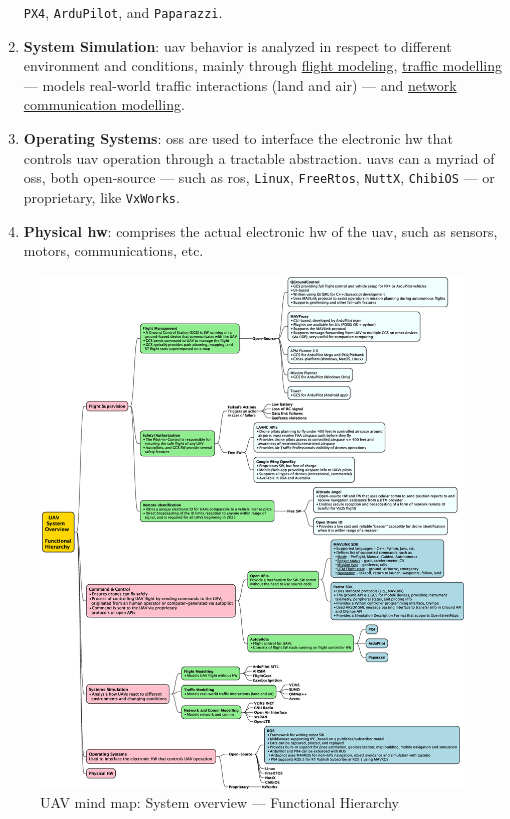 \begin{enumerate}
  \texttt{PX4}, \texttt{ArduPilot}, and \texttt{{Paparazzi}}.
\item \textbf{System Simulation}: \gls{uav} behavior is analyzed in respect to
  different environment and conditions, mainly through \underline{flight
    modeling},
  \underline{traffic modelling} --- models real-world traffic interactions
  (land and air) --- and
  \underline{network communication modelling}. 
\item \textbf{Operating Systems}: \glspl{os} are used to interface the
  electronic \gls{hw} that controls \gls{uav} operation through a tractable
  abstraction. \glspl{uav} can a myriad of \glspl{os}, both open-source --- such as
  \gls{ros}, \texttt{Linux}, \texttt{FreeRtos}, \texttt{NuttX}, \texttt{ChibiOS} --- or proprietary, like \texttt{VxWorks}. 
\item \textbf{Physical \gls{hw}}: comprises the actual electronic \gls{hw} of
  the \gls{uav}, such as sensors, motors, communications, etc.
\end{enumerate}

\begin{figure}[!hbt]
  \centering
  \includegraphics[width=1.0\textwidth]{./img/eps/uav2-2-mindmap.eps} 
%   
  \caption{UAV mind map: System overview --- Functional Hierarchy}%
  \label{fig:uav-sysOverv-hierarc-mindmap}
\end{figure}


